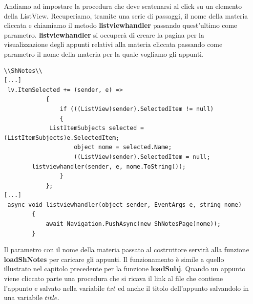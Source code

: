 \documentclass[a4paper, 50pt, twoside]{article}
\begin{document}
Andiamo ad impostare la procedura che deve scatenarsi al click su un elemento della ListView. Recuperiamo, tramite una serie di passaggi, il nome della materia cliccata e chiamiamo il metodo \textbf{listviewhandler} passando quest'ultimo come parametro. \textbf{listviewhandler} si occuperà di creare la pagina per la visualizzazione degli appunti relativi alla materia cliccata passando come parametro il nome della materia per la quale vogliamo gli appunti.
\begin{lstlisting}
\\ShNotes\\
[...]
 lv.ItemSelected += (sender, e) =>
            {
                if (((ListView)sender).SelectedItem != null)
                {
             ListItemSubjects selected = (ListItemSubjects)e.SelectedItem;
                    object nome = selected.Name;
                    ((ListView)sender).SelectedItem = null; 
		listviewhandler(sender, e, nome.ToString());
                }
            };
[...]
 async void listviewhandler(object sender, EventArgs e, string nome)
        {
            await Navigation.PushAsync(new ShNotesPage(nome));
        }
\end{lstlisting}
Il parametro con il nome della materia passato al costruttore servirà alla funzione \textbf{loadShNotes} per caricare gli appunti. Il funzionamento è simile a quello illustrato nel capitolo precedente per la funzione \textbf{loadSubj}. Quando un appunto viene cliccato parte una procedura che si ricava il link al file che contiene l'appunto e salvato nella variabile $txt$ ed anche il titolo dell'appunto salvandolo in una variabile $title$.
\end{document}
